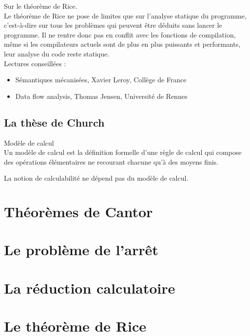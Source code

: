     \begin{Note} Sur le théorème de Rice.\\
        Le théorème de Rice ne pose de limites que sur l'analyse statique du programme, c'est-à-dire sur tous les problèmes qui peuvent être déduits sans lancer le programme. Il ne rentre donc pas en conflit avec les fonctions de compilation, même si les compilateurs actuels sont de plus en plus puissants et performants, leur analyse du code reste statique.\\
        Lectures conseillées :
        \begin{itemize}
            \item Sémantiques mécanisées, Xavier Leroy, Collège de France
            \item Data flow analysis, Thomas Jensen, Université de Rennes
        \end{itemize}
    \end{Note}

    \subsection{La thèse de Church}
    \begin{definition}
        Modèle de calcul\\
        Un modèle de calcul est la définition formelle d'une règle de calcul qui compose des opérations élémentaires ne recourant chacune qu'à des moyens finis.
    \end{definition}
    \begin{result}
        La notion de calculabilité ne dépend pas du modèle de calcul.
    \end{result}
    
  \section{Th\'eor\`emes de Cantor}\label{sec:theoremes_cantor}
  
  
  \section{Le probl\`eme de l'arrêt}\label{sec:probleme_arret}
  
  
  \section{La r\'eduction calculatoire}\label{sec:reduction_calculatoire}
  
  
  \section{Le th\'eor\`eme de Rice}\label{sec:theoreme_rice}